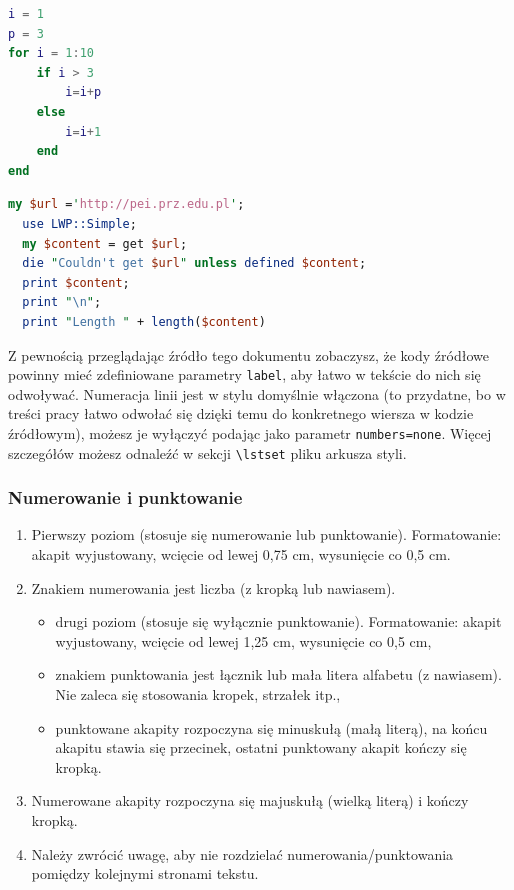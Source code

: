 \documentclass[12pt]{article}
\begin{document}
\begin{lstlisting}[language=Matlab,caption=Listing programu Matlab,label={KodMatlab1}]
i = 1
p = 3
for i = 1:10
    if i > 3
        i=i+p
    else 
        i=i+1
    end
end
\end{lstlisting}

\begin{lstlisting}[language=Perl,caption=Listing programu Perl,label={KodPerl1}]
  my $url ='http://pei.prz.edu.pl';
  use LWP::Simple;
  my $content = get $url;
  die "Couldn't get $url" unless defined $content;
  print $content;
  print "\n";
  print "Length " + length($content)
\end{lstlisting}

Z pewnością przeglądając źródło tego dokumentu zobaczysz, że kody źródłowe powinny mieć zdefiniowane parametry \verb|label|, aby łatwo w tekście do nich się odwoływać.
Numeracja linii jest w stylu domyślnie włączona (to przydatne, bo w treści pracy łatwo odwołać się dzięki temu do konkretnego wiersza w kodzie źródłowym), możesz je wyłączyć podając jako parametr \verb|numbers=none|. Więcej szczegółów możesz odnaleźć w sekcji \verb|\lstset| pliku arkusza styli.


\subsubsection{Numerowanie i punktowanie}

\begin{enumerate}[label=\arabic*), leftmargin=1.25cm]
	\item Pierwszy poziom (stosuje się numerowanie lub punktowanie). Formatowanie:
	      akapit wyjustowany, wcięcie od lewej 0,75 cm, wysunięcie co 0,5 cm.
	\item Znakiem numerowania jest liczba (z kropką lub nawiasem).
	      \begin{itemize}[label=-,labelsep=0.4cm,leftmargin=0.6cm]
		      \item drugi poziom (stosuje się wyłącznie punktowanie). Formatowanie: akapit
		            wyjustowany, wcięcie od lewej 1,25 cm, wysunięcie co 0,5 cm,
		      \item znakiem punktowania jest łącznik lub mała litera alfabetu (z nawiasem). Nie
		            zaleca się stosowania kropek, strzałek itp.,
		      \item punktowane akapity rozpoczyna się minuskułą (małą literą), na końcu akapitu
		            stawia się przecinek, ostatni punktowany akapit kończy się kropką.
	      \end{itemize}
	\item Numerowane akapity rozpoczyna się majuskułą (wielką literą) i kończy kropką.
	\item Należy zwrócić uwagę, aby nie rozdzielać numerowania/punktowania pomiędzy
	      kolejnymi stronami tekstu.
\end{enumerate}
\end{document}
